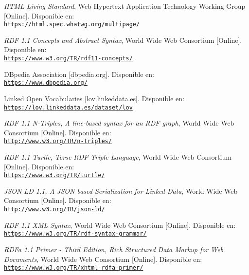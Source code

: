 \begin{thebibliography}{X}
            \textit{HTML Living Standard}, Web Hypertext Application Technology Working Group [Online]. Disponible en:
            \\ \texttt{\url{https://html.spec.whatwg.org/multipage/}}
            
            \textit{RDF 1.1 Concepts and Abstract Syntax}, World Wide Web Consortium [Online]. Disponible en:
            \\ \texttt{\url{https://www.w3.org/TR/rdf11-concepts/}}
        
            DBpedia Association [dbpedia.org]. Disponible en:
            \\ \texttt{\url{https://www.dbpedia.org/}}
        
            Linked Open Vocabularies [lov.linkeddata.es]. Disponible en:
            \\ \texttt{\url{https://lov.linkeddata.es/dataset/lov}}
        
            \textit{RDF 1.1 N-Triples, A line-based syntax for an RDF graph}, World Wide Web Consortium [Online]. Disponible en:
            \\ \texttt{\url{http://www.w3.org/TR/n-triples/}}
        
            \textit{RDF 1.1 Turtle, Terse RDF Triple Language}, World Wide Web Consortium [Online]. Disponible en:
            \\ \texttt{\url{https://www.w3.org/TR/turtle/}}
            
            \textit{JSON-LD 1.1, A JSON-based Serialization for Linked Data}, World Wide Web Consortium [Online]. Disponible en: 
            \\ \texttt{\url{http://www.w3.org/TR/json-ld/}}
        
            \textit{RDF 1.1 XML Syntax}, World Wide Web Consortium [Online]. Disponible en:
            \\ \texttt{\url{https://www.w3.org/TR/rdf-syntax-grammar/}}
            
            \textit{RDFa 1.1 Primer - Third Edition, Rich Structured Data Markup for Web Documents}, World Wide Web Consortium [Online]. Disponible en:
            \\ \texttt{\url{https://www.w3.org/TR/xhtml-rdfa-primer/}}
            

\end{thebibliography}
